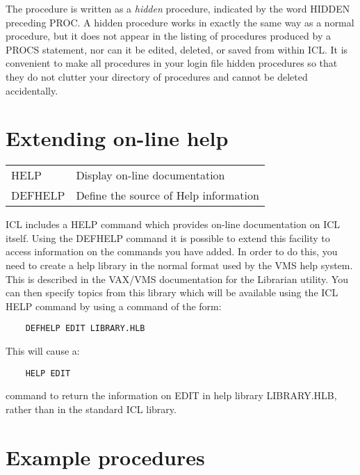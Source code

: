 The procedure is written as a {\em hidden} procedure, indicated by the word
HIDDEN preceding PROC.
A hidden procedure works in exactly the same way as a normal procedure, but it
does not appear in the listing of procedures produced by a PROCS statement,
nor can it be edited, deleted, or saved from within ICL.
It is convenient to make all procedures in your login file hidden procedures
so that they do not clutter your directory of procedures and cannot be
deleted accidentally.

\section{Extending on-line help}
\label{S_eolh}

\begin{center}
\begin{tabular}{|l|l|}
\hline
HELP        & Display on-line documentation \\
DEFHELP     & Define the source of Help information \\
\hline
\end{tabular}
\end{center}

ICL includes a HELP command which provides on-line documentation on ICL
itself.
Using the DEFHELP command it is possible to extend this facility to access
information on the commands you have added.
In order to do this, you need to create a help library in the normal format used
by the VMS help system.
This is described in the VAX/VMS documentation for the Librarian utility.
You can then specify topics from this library which will be available using
the ICL HELP command by using a command of the form:

\begin{small}
\begin{verbatim}
    DEFHELP EDIT LIBRARY.HLB
\end{verbatim}
\end{small}

This will cause a:

\begin{small}
\begin{verbatim}
    HELP EDIT
\end{verbatim}
\end{small}

command to return the information on EDIT in help library LIBRARY.HLB, rather
than in the standard ICL library.

\section{Example procedures}
\label{S_exproc}

